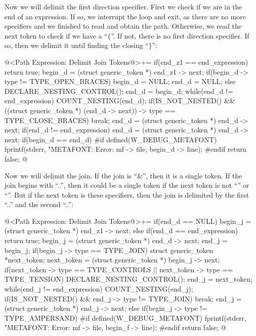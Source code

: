 Now we will delimit the first direction specifier. First we check if
we are in the end of an expression. If so, we interrupt the loop and
exit, as there are no more specifiers and we finished to read and
obtain the path. Otherwise, we read the next token to check if we have
a ``$\{$''. If not, there is no first direction specifier.  If so, then
we delimit it until finding the closing ``$\}$'':

\iniciocodigo
@<Path Expression: Delimit Join Tokens@>+=
if(end_z1 == end_expression)
  return true;
begin_d = (struct generic_token *) end_z1 -> next;
if(begin_d -> type != TYPE_OPEN_BRACES){
  begin_d = NULL;
  end_d = NULL;
}
else{
  DECLARE_NESTING_CONTROL();
  end_d = begin_d;
  while(end_d != end_expression){
    COUNT_NESTING(end_d);
    if(IS_NOT_NESTED() &&
       ((struct generic_token *) (end_d -> next)) -> type == TYPE_CLOSE_BRACES)
      break;
    end_d = (struct generic_token *) end_d -> next;
  }
  if(end_d != end_expression)
    end_d = (struct generic_token *) end_d -> next;
  if(begin_d == end_d){
#if defined(W_DEBUG_METAFONT)
    fprintf(stderr, "METAFONT: Error: %
            mf -> file, begin_d -> line);
#endif
    return false;
  }
}
@
\fimcodigo

Now we will delimit the join. If the join is ``\&'', then it is a
single token. If the join begins with ``..'', then it could be a
single token if the next token is not ``'' or
``''. But if the next token is these specifiers,
then the join is delimited by the first ``..'' and the second ``..'':

\iniciocodigo
@<Path Expression: Delimit Join Tokens@>+=
if(end_d == NULL)
  begin_j = (struct generic_token *) end_z1 -> next;
else{
  if(end_d == end_expression)
    return true;
  begin_j = (struct generic_token *) end_d -> next;
}
end_j = begin_j;
if(begin_j -> type == TYPE_JOIN){
  struct generic_token *next_token;
  next_token = (struct generic_token *) begin_j -> next;
  if(next_token -> type == TYPE_CONTROLS || next_token -> type == TYPE_TENSION){
    DECLARE_NESTING_CONTROL();
    end_j = next_token;
    while(end_j != end_expression){
      COUNT_NESTING(end_j);
      if(IS_NOT_NESTED() && end_j -> type != TYPE_JOIN)
        break;
      end_j = (struct generic_token *) end_j -> next;
    }
  }
}
else if(begin_j -> type != TYPE_AMPERSAND){
#if defined(W_DEBUG_METAFONT)
  fprintf(stderr, "METAFONT: Error: %
          mf -> file, begin_f -> line);
#endif
  return false;
}
@
\fimcodigo

